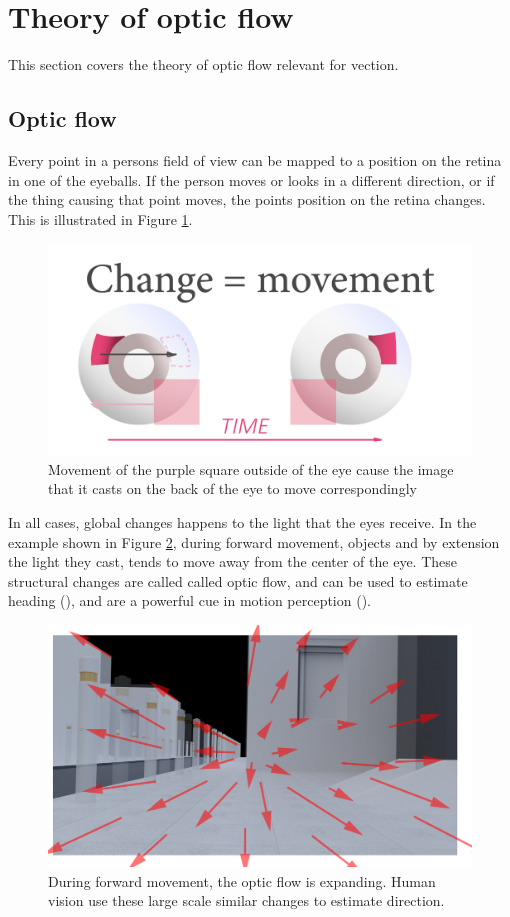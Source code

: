 \documentclass[11pt,a4paper,oneside,table,xcdraw]{article}
\begin{document}
\section{Theory of optic flow}
This section covers the theory of optic flow relevant for vection.
\subsection{Optic flow}
Every point in a persons field of view can be mapped to a position on the retina in one of the eyeballs. If the person moves or looks in a different direction, or if the thing causing that point moves, the points position on the retina changes. This is illustrated in Figure \ref{fig:eye}.
\begin{figure}[H]
		\centering
		\includegraphics[width=0.7\linewidth]{figure/eyes.png}
		\caption{Movement of the purple square outside of the eye cause the image that it casts on the back of the eye to move correspondingly}
		\label{fig:eye}
\end{figure}
In all cases, global changes happens to the light that the eyes receive. In the example shown in Figure \ref{fig:opticalflow}, during forward movement, objects and by extension the light they cast, tends to move away from the center of the eye. These structural changes are called called optic flow, and can be used to estimate heading (\cite{opticflowheading}), and are a powerful cue in motion perception (\cite{opticalflow}).
\begin{figure}[H]
		\centering
		\includegraphics[width=0.8\linewidth]{figure/opticalflow.png}
		\caption{During forward movement, the optic flow is expanding. Human vision use these large scale similar changes to estimate direction.}
		\label{fig:opticalflow}
\end{figure}
\end{document}
